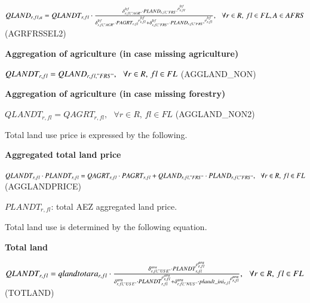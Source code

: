 \documentclass[10pt,a4paper,titlepage,dvipdfmx]{book}
\begin{document}
\begin{center}$QLAND_{r,fl,a}=QLANDT_{r,fl}\cdot \frac{\delta _{r,fl,"AGR"}^{ltf}\cdot PLAN{D_{r,fl,"FRS"}}^{\rho _{r,fl}^{ltf}}}{\delta _{r,fl,"AGR"}^{ltf}\cdot PAGR{T_{r,fl}}^{\rho _{r,fl}^{ltf}}+\delta _{r,fl,"FRS"}^{ltf}\cdot PLAN{D_{r,fl,"FRS"}}^{\rho _{r,fl}^{ltf}}},\,\,\,\,\forall r\in R,\,fl\in FL,A\in AFRS$ (AGRFRSSEL2)
\end{center}

\begin{flushleft}\textbf{Aggregation of agriculture (in case missing agriculture)}\end{flushleft}


\begin{center}$QLANDT_{r,fl}=QLAND_{r,fl,"FRS"},\,\,\,\,\forall r\in R,\,fl\in FL$ (AGGLAND\_NON)
\end{center}

\begin{flushleft}\textbf{Aggregation of agriculture (in case missing forestry)}\end{flushleft}


\begin{center}$QLANDT_{r,fl}=QAGRT_{r,fl},\,\,\,\,\forall r\in R,\,fl\in FL$ (AGGLAND\_NON2)
\end{center}

Total land use price is expressed by the following.

\begin{flushleft}\textbf{Aggregated total land price}\end{flushleft}


\begin{center}$QLANDT_{r,fl}\cdot PLANDT_{r,fl}=QAGRT_{r,fl}\cdot PAGRT_{r,fl}+QLAND_{r,fl,"FRS"}\cdot PLAND_{r,fl,"FRS"},\,\,\,\,\forall r\in R,\,fl\in FL$ (AGGLANDPRICE)
\end{center}

\begin{flushleft}$PLANDT_{r,fl}$: total AEZ aggregated land price. \end{flushleft}

Total land use is determined by the following equation.

\begin{flushleft}\textbf{Total land}\end{flushleft}


\begin{center}$QLANDT_{r,fl}=qlandtotara_{r,fl}\cdot \frac{\delta _{r,fl,"USE"}^{ara}\cdot PLANDT_{r,fl}^{\rho _{r,fl}^{ara}}}{\delta _{r,fl,"USE"}^{ara}\cdot PLANDT_{r,fl}^{\rho _{r,fl}^{ara}}+\delta _{r,fl,"NUS"}^{ara}\cdot plandt\_ in{i_{r,fl}}^{\rho _{r,fl}^{ara}}},\,\,\,\,\forall r\in R,\,fl\in FL$ (TOTLAND)
\end{center}
\end{document}
